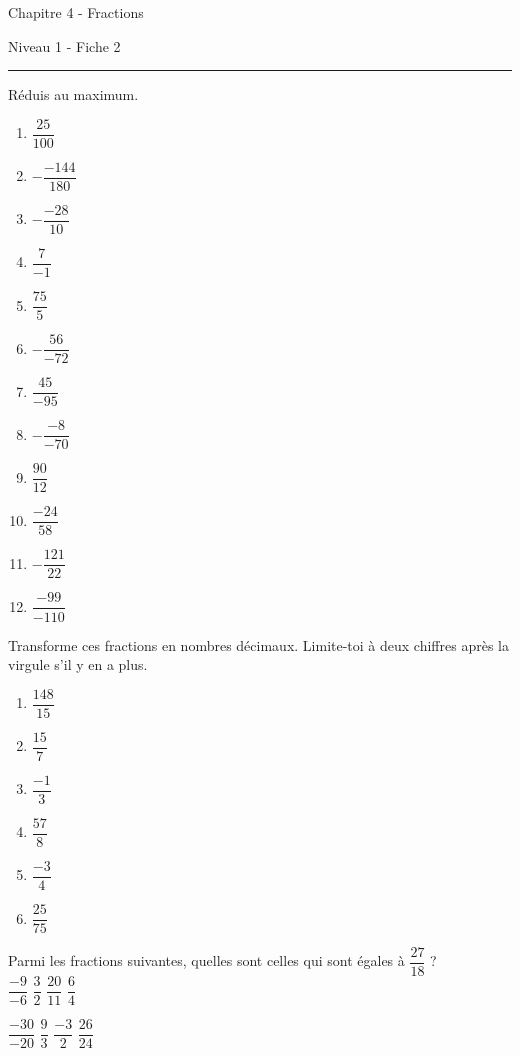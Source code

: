 \documentclass[12pt,parskip=half-, twoside=semi]{scrartcl}
\begin{document}
\newpage

\begin{center}
  \bfseries
  \begin{Huge}
    Chapitre 4 - Fractions
  \end{Huge}
  \smallbreak
  \begin{large}
    Niveau 1  - Fiche 2
  \end{large}
  \smallbreak
  \rule[10pt]{.5\linewidth}{1 pt}
\end{center}

\setcounter{exercise}{0}

\begin{exercise}
  Réduis au maximum.
  \begin{enumerate}[cols=3]
    \item $\dfrac{25}{100}$
    \item $- \dfrac{-144}{180}$
    \item $-\dfrac{-28}{10}$
    \item $\dfrac{7}{-1}$
    \item $\dfrac{75}{5}$
    \item $-\dfrac{56}{-72}$
    \item $\dfrac{45}{-95}$
    \item $- \dfrac{-8}{-70}$
    \item $\dfrac{90}{12}$
    \item $\dfrac{-24}{58}$
    \item $-\dfrac{121}{22}$
    \item $\dfrac{-99}{-110}$
  \end{enumerate}
\end{exercise}

\begin{exercise}
  Transforme ces fractions en nombres décimaux. Limite-toi à deux chiffres après la virgule s'il y en a plus. 
\begin{enumerate}[cols=3]
  \item \(\dfrac{148}{15}\)
  \item \(\dfrac{15}{7}\)
  \item \(\dfrac{-1}{3}\)
  \item \(\dfrac{57}{8}\)
  \item \(\dfrac{-3}{4}\)
  \item \(\dfrac{25}{75}\)
\end{enumerate}
\end{exercise}

\begin{exercise}
  Parmi les fractions suivantes, quelles sont celles qui sont égales à \(\dfrac{27}{18}\) ? \\
  \(\dfrac{-9}{-6}\) \hfill \(\dfrac{3}{2}\) \hfill \(\dfrac{20}{11}\) \hfill \(\dfrac{6}{4}\) \\ 

  \vspace{2em}

  \(\dfrac{-30}{-20}\) \hfill \(\dfrac{9}{3}\) \hfill \(\dfrac{-3}{2}\) \hfill \(\dfrac{26}{24}\)
\end{exercise}
\end{document}
